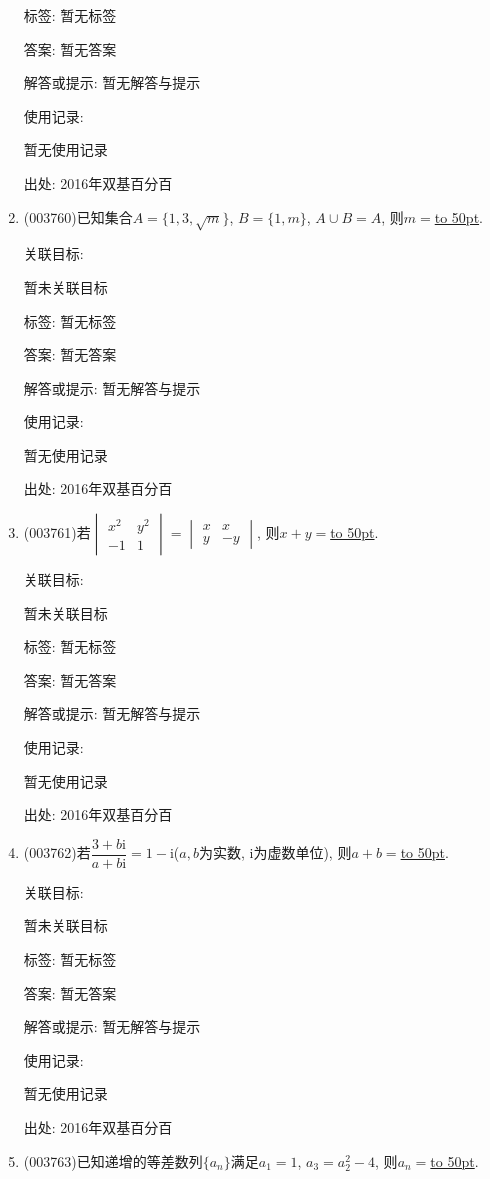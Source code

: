 \documentclass[10pt,a4paper]{article}
\newcommand{\blank}[1]{\underline{\hbox to #1pt{}}}
\begin{document}
\begin{enumerate}[1.]
标签: 暂无标签

答案: 暂无答案

解答或提示: 暂无解答与提示

使用记录:

暂无使用记录


出处: 2016年双基百分百
\item { (003760)}已知集合$A=\{1,3,\sqrt{m}\}$, $B=\{1,m\}$, $A\cup B=A$, 则$m=$\blank{50}.


关联目标:

暂未关联目标



标签: 暂无标签

答案: 暂无答案

解答或提示: 暂无解答与提示

使用记录:

暂无使用记录


出处: 2016年双基百分百
\item { (003761)}若$\begin{vmatrix}
x^2 & y^2\\-1 & 1
\end{vmatrix}=\begin{vmatrix}
x & x \\ y & -y
\end{vmatrix}$, 则$x+y=$\blank{50}.


关联目标:

暂未关联目标



标签: 暂无标签

答案: 暂无答案

解答或提示: 暂无解答与提示

使用记录:

暂无使用记录


出处: 2016年双基百分百
\item { (003762)}若$\dfrac{3+b\mathrm{i}}{a+b\mathrm{i}}=1-\mathrm{i}$($a,b$为实数, $\mathrm{i}$为虚数单位), 则$a+b=$\blank{50}.


关联目标:

暂未关联目标



标签: 暂无标签

答案: 暂无答案

解答或提示: 暂无解答与提示

使用记录:

暂无使用记录


出处: 2016年双基百分百
\item { (003763)}已知递增的等差数列$\{a_n\}$满足$a_1=1$, $a_3=a_2^2-4$, 则$a_n=$\blank{50}.



\end{enumerate}
\end{document}
